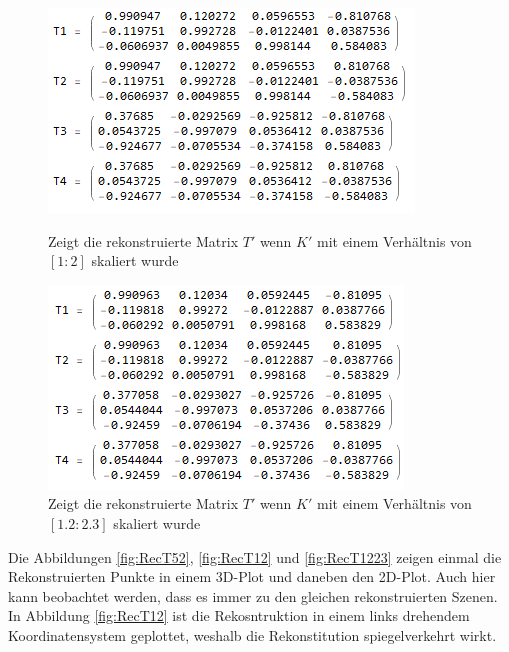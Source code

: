 \begin{figure}[!htb]
	\includegraphics[width=\linewidth]{images/R_12.png}
	\caption[Vier Lösungen für $T$ bei $K'$ mit 1:2]{Zeigt die rekonstruierte Matrix $T'$ wenn $K'$ mit einem Verhältnis von $[1:2]$ skaliert wurde}
	\label{fig:T12}
	\endminipage\hfill
	\includegraphics[width=\linewidth]{images/R_12_23.png}
	\caption[Vier Lösungen für $T$ bei $K'$ mit 1.2 : 2.3]{Zeigt die rekonstruierte Matrix $T'$ wenn $K'$ mit einem Verhältnis von $[1.2:2.3]$ skaliert wurde}
	\label{fig:T1223}
	\endminipage\hfill
\end{figure}
\pagebreak

Die Abbildungen \ref{fig:RecT52}, \ref{fig:RecT12} und \ref{fig:RecT1223} zeigen einmal die Rekonstruierten Punkte in einem 3D-Plot und daneben den 2D-Plot. Auch hier kann beobachtet werden, dass es immer zu den gleichen rekonstruierten Szenen. In Abbildung \ref{fig:RecT12} ist die Rekosntruktion in einem links drehendem Koordinatensystem geplottet, weshalb die Rekonstitution spiegelverkehrt wirkt. 


